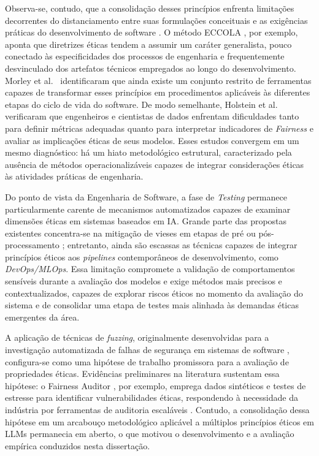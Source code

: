 Observa-se, contudo, que a consolidação desses princípios enfrenta limitações decorrentes do distanciamento entre suas formulações conceituais e as exigências práticas do desenvolvimento de software \cite{S042, S058}. O método ECCOLA \cite{S012, S013}, por exemplo, aponta que diretrizes éticas tendem a assumir um caráter generalista, pouco conectado às especificidades dos processos de engenharia e frequentemente desvinculado dos artefatos técnicos empregados ao longo do desenvolvimento. Morley et al.~\cite{Morley2020} identificaram que ainda existe um conjunto restrito de ferramentas capazes de transformar esses princípios em procedimentos aplicáveis às diferentes etapas do ciclo de vida do software. De modo semelhante, Holstein et al.~\cite{Holstein2019} verificaram que engenheiros e cientistas de dados enfrentam dificuldades tanto para definir métricas adequadas quanto para interpretar indicadores de \textit{Fairness} e avaliar as implicações éticas de seus modelos. Esses estudos convergem em um mesmo diagnóstico: há um hiato metodológico estrutural, caracterizado pela ausência de métodos operacionalizáveis capazes de integrar considerações éticas às atividades práticas de engenharia.

Do ponto de vista da Engenharia de Software, a fase de \textit{Testing} permanece particularmente carente de mecanismos automatizados capazes de examinar dimensões éticas em sistemas baseados em IA. Grande parte das propostas existentes concentra-se na mitigação de vieses em etapas de pré ou pós-processamento \cite{S003, S004, S022}; entretanto, ainda são escassas as técnicas capazes de integrar princípios éticos aos \textit{pipelines} contemporâneos de desenvolvimento, como \textit{DevOps/MLOps}. Essa limitação compromete a validação de comportamentos sensíveis durante a avaliação dos modelos e exige métodos mais precisos e contextualizados, capazes de explorar riscos éticos no momento da avaliação do sistema e de consolidar uma etapa de testes mais alinhada às demandas éticas emergentes da área.

A aplicação de técnicas de \textit{fuzzing}, originalmente desenvolvidas para a investigação automatizada de falhas de segurança em sistemas de software \cite{Manes2021}, configura-se como uma hipótese de trabalho promissora para a avaliação de propriedades éticas. Evidências preliminares na literatura sustentam essa hipótese: o Fairness Auditor \cite{Bhanot2023}, por exemplo, emprega dados sintéticos e testes de estresse para identificar vulnerabilidades éticas, respondendo à necessidade da indústria por ferramentas de auditoria escaláveis \cite{Holstein2019}. Contudo, a consolidação dessa hipótese em um arcabouço metodológico aplicável a múltiplos princípios éticos em LLMs permanecia em aberto, o que motivou o desenvolvimento e a avaliação empírica conduzidos nesta dissertação.

